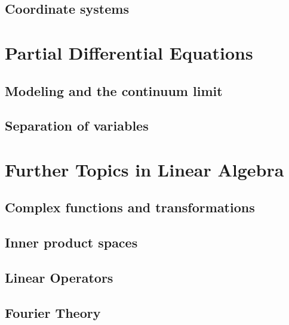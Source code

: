\documentclass[12pt,letterpaper, openany]{book} %
\begin{document}
\chapter{Coordinate systems}



\part{Partial Differential Equations}
\chapter{Modeling and the continuum limit}


\chapter{Separation of variables}



\part{Further Topics in Linear Algebra}
\chapter{Complex functions and transformations}


\chapter{Inner product spaces}


\chapter{Linear Operators}


\chapter{Fourier Theory}




\newenvironment{changemargin}[1]{%
\begin{list}{}{%
\setlength{\topsep}{#1}
\setlength{\listparindent}{\parindent}%
\setlength{\itemindent}{\parindent}%
\setlength{\parsep}{\parskip}%
}%
\item[]}{\end{list}}

\begin{changemargin}{3cm}
\printindex
\end{changemargin}
\end{document}

